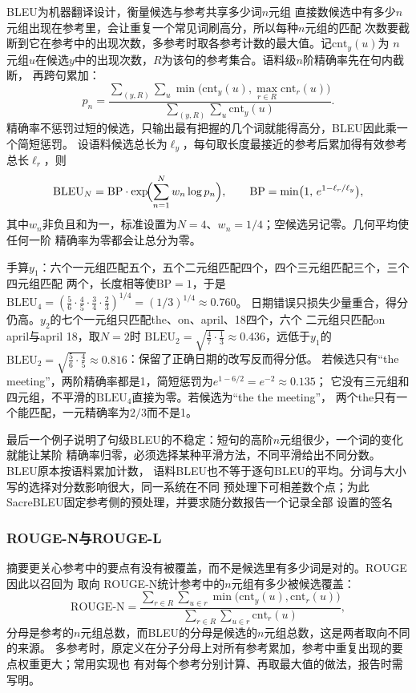 BLEU为机器翻译设计，衡量候选与参考共享多少词$n$元组
直接数候选中有多少$n$元组出现在参考里，会让重复一个常见词刷高分，所以每种$n$元组的匹配
次数要截断到它在参考中的出现次数，多参考时取各参考计数的最大值。记$\mathrm{cnt}_y(u)$为
$n$元组$u$在候选$y$中的出现次数，$R$为该句的参考集合。语料级$n$阶精确率先在句内截断，
再跨句累加：
\[
  p_n=\frac{\sum_{(y,R)}\sum_{u}\min\bigl(\mathrm{cnt}_y(u),\max_{r\in R}\mathrm{cnt}_r(u)\bigr)}
  {\sum_{(y,R)}\sum_{u}\mathrm{cnt}_y(u)} .
\]
精确率不惩罚过短的候选，只输出最有把握的几个词就能得高分，BLEU因此乘一个简短惩罚。
设语料候选总长为$\ell_y$，每句取长度最接近的参考后累加得有效参考总长$\ell_r$，则
\begin{equation}
  \mathrm{BLEU}_N=\mathrm{BP}\cdot\exp\!\Bigl(\sum_{n=1}^{N}w_n\log p_n\Bigr),\qquad
  \mathrm{BP}=\min\bigl(1,\,e^{1-\ell_r/\ell_y}\bigr),
  \label{eq:nlp-generation-bleu}
\end{equation}
其中$w_n$非负且和为一，标准设置为$N=4$、$w_n=1/4$；空候选另记零。几何平均使任何一阶
精确率为零都会让总分为零。

手算$y_1$：六个一元组匹配五个，五个二元组匹配四个，四个三元组匹配三个，三个四元组匹配
两个，长度相等使$\mathrm{BP}=1$，于是
$\mathrm{BLEU}_4=(\tfrac56\cdot\tfrac45\cdot\tfrac34\cdot\tfrac23)^{1/4}=(1/3)^{1/4}\approx0.760$。
日期错误只损失少量重合，得分仍高。$y_2$的七个一元组只匹配the、on、april、18四个，六个
二元组只匹配on april与april 18，取$N=2$时
$\mathrm{BLEU}_2=\sqrt{\tfrac47\cdot\tfrac13}\approx0.436$，远低于$y_1$的
$\mathrm{BLEU}_2=\sqrt{\tfrac56\cdot\tfrac45}\approx0.816$：保留了正确日期的改写反而得分低。
若候选只有“the meeting”，两阶精确率都是1，简短惩罚为$e^{1-6/2}=e^{-2}\approx0.135$；
它没有三元组和四元组，不平滑的$\mathrm{BLEU}_4$直接为零。若候选为“the the meeting”，
两个the只有一个能匹配，一元精确率为$2/3$而不是1。

最后一个例子说明了句级BLEU的不稳定：短句的高阶$n$元组很少，一个词的变化就能让某阶
精确率归零，必须选择某种平滑方法，不同平滑给出不同分数。BLEU原本按语料累加计数，
语料BLEU也不等于逐句BLEU的平均。分词与大小写的选择对分数影响很大，同一系统在不同
预处理下可相差数个点；为此SacreBLEU固定参考侧的预处理，并要求随分数报告一个记录全部
设置的签名

\subsubsection{ROUGE-N与ROUGE-L}
\label{sec:nlp-generation-rouge}

摘要更关心参考中的要点有没有被覆盖，而不是候选里有多少词是对的。ROUGE因此以召回为
取向
ROUGE-N统计参考中的$n$元组有多少被候选覆盖：
\begin{equation}
  \mathrm{ROUGE\text{-}N}=\frac{\sum_{r\in R}\sum_{u\in r}\min\bigl(\mathrm{cnt}_y(u),\mathrm{cnt}_r(u)\bigr)}
  {\sum_{r\in R}\sum_{u\in r}\mathrm{cnt}_r(u)},
  \label{eq:nlp-generation-rouge-n}
\end{equation}
分母是参考的$n$元组总数，而BLEU的分母是候选的$n$元组总数，这是两者取向不同的来源。
多参考时，原定义在分子分母上对所有参考累加，参考中重复出现的要点权重更大；常用实现也
有对每个参考分别计算、再取最大值的做法，报告时需写明。

